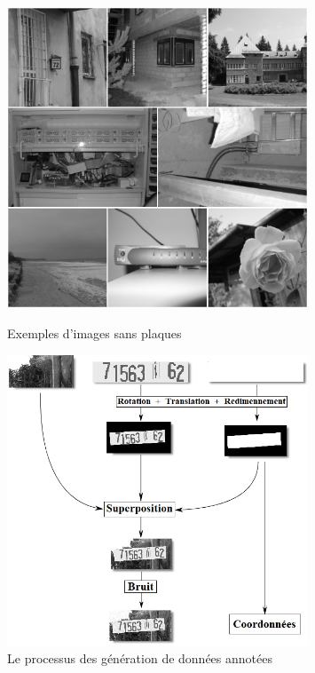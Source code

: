 \begin{frame}
\begin{columns}
\begin{column}{6cm}
\begin{figure}
\begin{overprint}
            \centering\includegraphics[width=0.8\textwidth]{figures/SUN_data.PNG}\caption{Exemples d'images sans plaques}
            \centering\includegraphics[width=0.8\textwidth]{figures/Gen_process.PNG}\caption{Le processus des génération de données annotées}

\end{overprint}
\end{figure}
\end{column}
\end{columns}
\end{frame}
